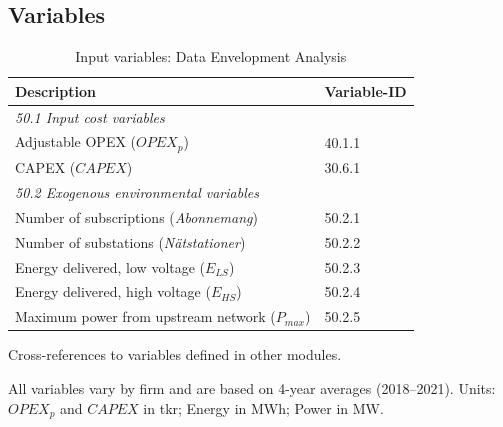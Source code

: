 \subsection{Variables}

\begin{table}[H]
\centering
\footnotesize
\begin{threeparttable}
\caption{Input variables: Data Envelopment Analysis}
\label{tab:dea-input-variables}
\begin{tabular}{@{}ll@{}}
\toprule
\textbf{Description} & \textbf{Variable-ID} \\
\midrule
\multicolumn{2}{l}{\textit{50.1 Input cost variables}} \\
Adjustable OPEX ($OPEX_p$)\tnote{a} & 40.1.1 \\
CAPEX ($CAPEX$)\tnote{a} & 30.6.1 \\
\midrule
\multicolumn{2}{l}{\textit{50.2 Exogenous environmental variables}} \\
Number of subscriptions (\textit{Abonnemang}) & 50.2.1 \\
Number of substations (\textit{Nätstationer}) & 50.2.2 \\
Energy delivered, low voltage ($E_{LS}$) & 50.2.3 \\
Energy delivered, high voltage ($E_{HS}$) & 50.2.4 \\
Maximum power from upstream network ($P_{max}$) & 50.2.5 \\
\bottomrule
\end{tabular}
\begin{tablenotes}
\item[a] Cross-references to variables defined in other modules.
\item All variables vary by firm and are based on 4-year averages (2018--2021). Units: $OPEX_p$ and $CAPEX$ in tkr; Energy in MWh; Power in MW.
\end{tablenotes}
\end{threeparttable}
\end{table}


